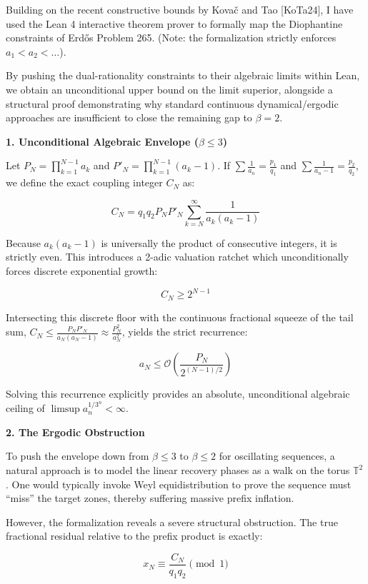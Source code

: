 \documentclass{article}
\begin{document}
Building on the recent constructive bounds by Kova\v{c} and Tao [KoTa24], I have used the Lean 4 interactive theorem prover to formally map the Diophantine constraints of Erd\H{o}s Problem 265. (Note: the formalization strictly enforces $a_1 < a_2 < \dots$). 

By pushing the dual-rationality constraints to their algebraic limits within Lean, we obtain an unconditional upper bound on the limit superior, alongside a structural proof demonstrating why standard continuous dynamical/ergodic approaches are insufficient to close the remaining gap to $\beta = 2$.

\textbf{1. Unconditional Algebraic Envelope ($\beta \le 3$)}

Let $P_N = \prod_{k=1}^{N-1} a_k$ and $P'_N = \prod_{k=1}^{N-1} (a_k-1)$. If $\sum \frac{1}{a_n} = \frac{p_1}{q_1}$ and $\sum \frac{1}{a_n-1} = \frac{p_2}{q_2}$, we define the exact coupling integer $C_N$ as:

$$ C_N = q_1 q_2 P_N P'_N \sum_{k=N}^\infty \frac{1}{a_k(a_k-1)} $$

Because $a_k(a_k-1)$ is universally the product of consecutive integers, it is strictly even. This introduces a 2-adic valuation ratchet which unconditionally forces discrete exponential growth:

$$ C_N \ge 2^{N-1} $$

Intersecting this discrete floor with the continuous fractional squeeze of the tail sum, $C_N \le \frac{P_N P'_N}{a_N(a_N - 1)} \approx \frac{P_N^2}{a_N^2}$, yields the strict recurrence:

$$ a_N \le \mathcal{O}\left( \frac{P_N}{2^{(N-1)/2}} \right) $$

Solving this recurrence explicitly provides an absolute, unconditional algebraic ceiling of $\limsup a_n^{1/3^n} < \infty$.

\textbf{2. The Ergodic Obstruction}

To push the envelope down from $\beta \le 3$ to $\beta \le 2$ for oscillating sequences, a natural approach is to model the linear recovery phases as a walk on the torus $\mathbb{T}^2$. One would typically invoke Weyl equidistribution to prove the sequence must ``miss'' the target zones, thereby suffering massive prefix inflation.

However, the formalization reveals a severe structural obstruction. The true fractional residual relative to the prefix product is exactly:

$$ x_N \equiv \frac{C_N}{q_1 q_2} \pmod 1 $$
\end{document}
